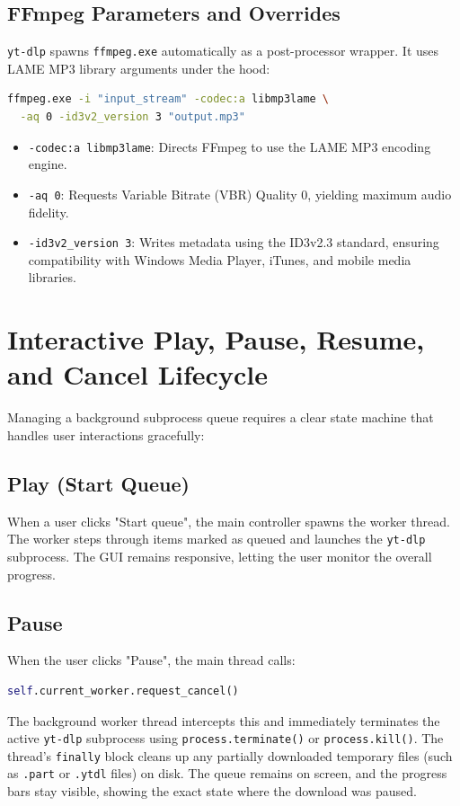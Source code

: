 \documentclass[12pt]{report}
\begin{document}
\subsection{FFmpeg Parameters and Overrides}
\texttt{yt-dlp} spawns \texttt{ffmpeg.exe} automatically as a post-processor wrapper. It uses LAME MP3 library arguments under the hood:
\begin{lstlisting}[language=bash]
ffmpeg.exe -i "input_stream" -codec:a libmp3lame \
  -aq 0 -id3v2_version 3 "output.mp3"
\end{lstlisting}
\begin{itemize}[leftmargin=*]
    \item \texttt{-codec:a libmp3lame}: Directs FFmpeg to use the LAME MP3 encoding engine.
    \item \texttt{-aq 0}: Requests Variable Bitrate (VBR) Quality 0, yielding maximum audio fidelity.
    \item \texttt{-id3v2\_version 3}: Writes metadata using the ID3v2.3 standard, ensuring compatibility with Windows Media Player, iTunes, and mobile media libraries.
\end{itemize}

\section{Interactive Play, Pause, Resume, and Cancel Lifecycle}
Managing a background subprocess queue requires a clear state machine that handles user interactions gracefully:

\subsection{Play (Start Queue)}
When a user clicks "Start queue", the main controller spawns the worker thread. The worker steps through items marked as queued and launches the \texttt{yt-dlp} subprocess. The GUI remains responsive, letting the user monitor the overall progress.

\subsection{Pause}
When the user clicks "Pause", the main thread calls:
\begin{lstlisting}[language=Python]
self.current_worker.request_cancel()
\end{lstlisting}
The background worker thread intercepts this and immediately terminates the active \texttt{yt-dlp} subprocess using \texttt{process.terminate()} or \texttt{process.kill()}. 
The thread's \texttt{finally} block cleans up any partially downloaded temporary files (such as \texttt{.part} or \texttt{.ytdl} files) on disk. The queue remains on screen, and the progress bars stay visible, showing the exact state where the download was paused.
\end{document}
